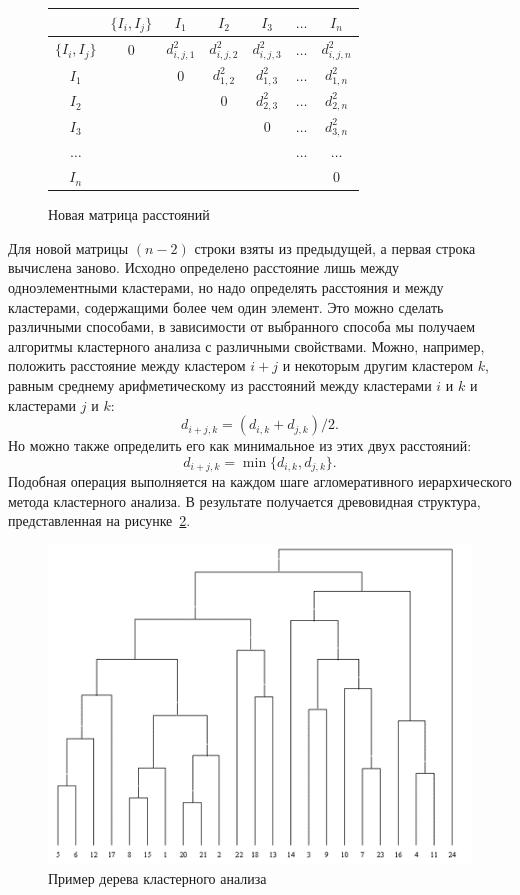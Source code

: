 \documentclass[a4paper,14pt,openany,final]{extreport} %
\begin{document}
{\begin{figure}[htbp]
  \centering
  \begin{tabular}{|c||c|c|c|c|c|c|}
    \hline
                  & $\{I_i,I_j\}$ & $I_1$         & $I_2$         & $I_3$         & $\ldots$ & $I_n$        \\
    \hline
    \hline
    $\{I_i,I_j\}$ &  0            & $d_{i,j,1}^2$ & $d_{i,j,2}^2$ & $d_{i,j,3}^2$ & $\ldots$ & $d_{i,j,n}^2$  \\
    \hline
    $I_1$ & & 0     & $d_{1,2}^2$ & $d_{1,3}^2$ & $\ldots$ & $d_{1,n}^2$  \\
    \hline
    $I_2$ & &      & 0           & $d_{2,3}^2$ & $\ldots$ & $d_{2,n}^2$  \\
    \hline
    $I_3$ & &      &             & 0           & $\ldots$ & $d_{3,n}^2$  \\
    \hline
 $\ldots$ & &      &             &             & $\ldots$ & $\ldots$ \\
    \hline
    $I_n$ & &      &             &             &          & 0  \\
    \hline
  \end{tabular}
  \caption{Новая матрица расстояний}
  \label{fig:disssimmnew}
\end{figure}
Для новой матрицы $(n-2)$ строки взяты из предыдущей, а первая строка вычислена заново. Исходно определено расстояние лишь между одноэлементными кластерами, но надо определять расстояния и между кластерами, содержащими более чем один элемент. Это можно сделать различными способами, в зависимости от выбранного способа мы получаем алгоритмы кластерного анализа с различными свойствами. Можно, например, положить расстояние между кластером $i + j$ и некоторым другим кластером $k$, равным среднему арифметическому из расстояний между кластерами $i$ и $k$ и кластерами $j$ и $k$:
\[d_{i+j,k}=(d_{i,k}+d_{j,k})/2.\]
Но можно также определить его как минимальное из этих двух расстояний:
\[d_{i+j,k}=\min⁡\{d_{i,k}, d_{j,k}\}.\]
Подобная операция выполняется на каждом шаге агломеративного иерархического метода кластерного анализа. В результате получается древовидная структура, представленная на рисунке~\ref{fig:hclusttree}.

\begin{figure}[htbp]
  \centering
  \includegraphics[width=0.5\linewidth]{hclustexample.png}
  \caption{Пример дерева кластерного анализа \protect\cite{aicourse}}
  \label{fig:hclusttree}
\end{figure}

}
\end{document}
